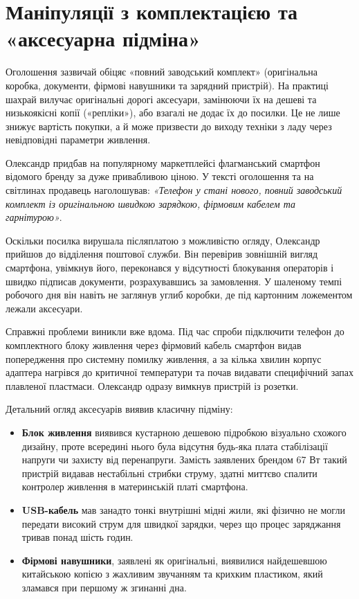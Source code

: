 \newpage 
\section{Маніпуляції з комплектацією та «аксесуарна підміна»}

Оголошення зазвичай обіцяє «повний заводський комплект» (оригінальна коробка, документи, фірмові навушники та зарядний пристрій). На практиці шахрай вилучає оригінальні дорогі аксесуари, замінюючи їх на дешеві та низькоякісні копії («репліки»), або взагалі не додає їх до посилки. Це не лише знижує вартість покупки, а й може призвести до виходу техніки з ладу через невідповідні параметри живлення.


Олександр придбав на популярному маркетплейсі флагманський смартфон відомого бренду за дуже привабливою ціною. У тексті оголошення та на світлинах продавець наголошував: \textit{«Телефон у стані нового, повний заводський комплект із оригінальною швидкою зарядкою, фірмовим кабелем та гарнітурою»}. 

Оскільки посилка вирушала післяплатою з можливістю огляду, Олександр прийшов до відділення поштової служби. Він перевірив зовнішній вигляд смартфона, увімкнув його, переконався у відсутності блокування операторів і швидко підписав документи, розрахувавшись за замовлення. У шаленому темпі робочого дня він навіть не заглянув углиб коробки, де під картонним ложементом лежали аксесуари.

Справжні проблеми виникли вже вдома. Під час спроби підключити телефон до комплектного блоку живлення через фірмовий кабель смартфон видав попередження про системну помилку живлення, а за кілька хвилин корпус адаптера нагрівся до критичної температури та почав видавати специфічний запах плавленої пластмаси. Олександр одразу вимкнув пристрій із розетки. 

\newpage 

Детальний огляд аксесуарів виявив класичну підміну:
\begin{itemize}
    \item \textbf{Блок живлення} виявився кустарною дешевою підробкою візуально схожого дизайну, проте всередині нього була відсутня будь-яка плата стабілізації напруги чи захисту від перенапруги. Замість заявлених брендом 67 Вт такий пристрій видавав нестабільні стрибки струму, здатні миттєво спалити контролер живлення в материнській платі смартфона.
    \item \textbf{USB-кабель} мав занадто тонкі внутрішні мідні жили, які фізично не могли передати високий струм для швидкої зарядки, через що процес заряджання тривав понад шість годин.
    \item \textbf{Фірмові навушники}, заявлені як оригінальні, виявилися найдешевшою китайською копією з жахливим звучанням та крихким пластиком, який зламався при першому ж згинанні дна.
\end{itemize}

